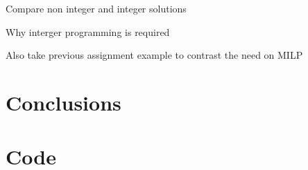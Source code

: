 \documentclass[paper=a4, fontsize=11pt]{scrartcl} %
\begin{document}
Compare non integer and integer solutions

Why interger programming is required

Also take previous assignment example to contrast the need on MILP


\section{Conclusions}
\clearpage
{}
\appendix
\section{Code}
\end{document}
